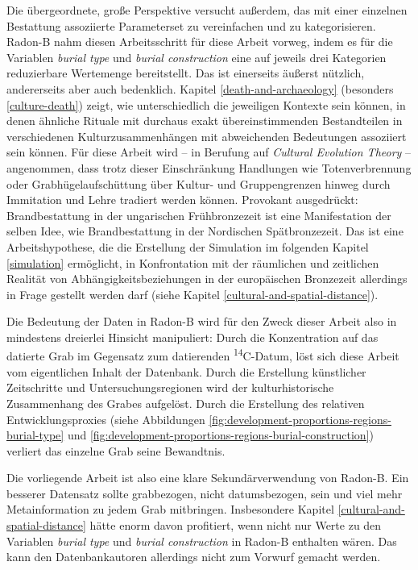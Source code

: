 \documentclass[openany,twoside,twocolumn]{book}
\begin{document}
Die übergeordnete, große Perspektive versucht außerdem, das mit einer
einzelnen Bestattung assoziierte Parameterset zu vereinfachen und zu
kategorisieren. Radon-B nahm diesen Arbeitsschritt für diese Arbeit
vorweg, indem es für die Variablen \emph{burial type} und \emph{burial
construction} eine auf jeweils drei Kategorien reduzierbare Wertemenge
bereitstellt. Das ist einerseits äußerst nützlich, andererseits aber
auch bedenklich. Kapitel \ref{death-and-archaeology} (besonders
\ref{culture-death}) zeigt, wie unterschiedlich die jeweiligen Kontexte
sein können, in denen ähnliche Rituale mit durchaus exakt
übereinstimmenden Bestandteilen in verschiedenen Kulturzusammenhängen
mit abweichenden Bedeutungen assoziiert sein können. Für diese Arbeit
wird -- in Berufung auf \emph{Cultural Evolution Theory} -- angenommen,
dass trotz dieser Einschränkung Handlungen wie Totenverbrennung oder
Grabhügelaufschüttung über Kultur- und Gruppengrenzen hinweg durch
Immitation und Lehre tradiert werden können. Provokant ausgedrückt:
Brandbestattung in der ungarischen Frühbronzezeit ist eine Manifestation
der selben Idee, wie Brandbestattung in der Nordischen Spätbronzezeit.
Das ist eine Arbeitshypothese, die die Erstellung der Simulation im
folgenden Kapitel \ref{simulation} ermöglicht, in Konfrontation mit der
räumlichen und zeitlichen Realität von Abhängigkeitsbeziehungen in der
europäischen Bronzezeit allerdings in Frage gestellt werden darf (siehe
Kapitel \ref{cultural-and-spatial-distance}).

Die Bedeutung der Daten in Radon-B wird für den Zweck dieser Arbeit also
in mindestens dreierlei Hinsicht manipuliert: Durch die Konzentration
auf das datierte Grab im Gegensatz zum datierenden
\textsuperscript{14}C-Datum, löst sich diese Arbeit vom eigentlichen
Inhalt der Datenbank. Durch die Erstellung künstlicher Zeitschritte und
Untersuchungsregionen wird der kulturhistorische Zusammenhang des Grabes
aufgelöst. Durch die Erstellung des relativen Entwicklungsproxies (siehe
Abbildungen \ref{fig:development-proportions-regions-burial-type} und
\ref{fig:development-proportions-regions-burial-construction}) verliert
das einzelne Grab seine Bewandtnis.

Die vorliegende Arbeit ist also eine klare Sekundärverwendung von
Radon-B. Ein besserer Datensatz sollte grabbezogen, nicht datumsbezogen,
sein und viel mehr Metainformation zu jedem Grab mitbringen.
Insbesondere Kapitel \ref{cultural-and-spatial-distance} hätte enorm
davon profitiert, wenn nicht nur Werte zu den Variablen \emph{burial
type} und \emph{burial construction} in Radon-B enthalten wären. Das
kann den Datenbankautoren allerdings nicht zum Vorwurf gemacht werden.
\end{document}
